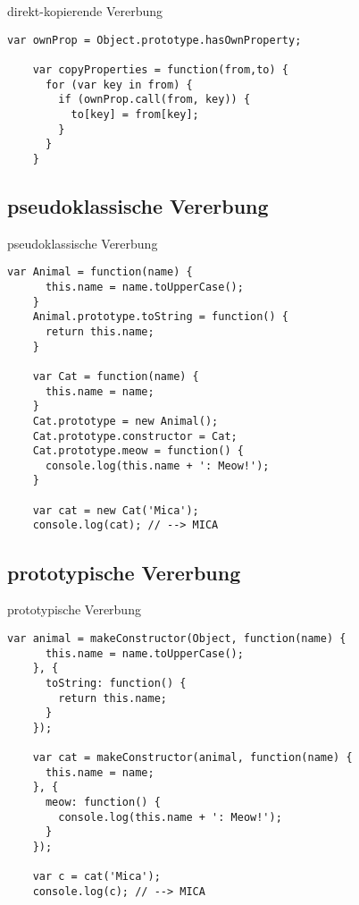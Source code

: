 \begin{frame}[fragile]{direkt-kopierende Vererbung}
  \begin{lstlisting}[gobble=4]
    var ownProp = Object.prototype.hasOwnProperty;
  
    var copyProperties = function(from,to) {
      for (var key in from) {
        if (ownProp.call(from, key)) {
          to[key] = from[key];
        }
      }
    }
  \end{lstlisting}
\end{frame}

\subsection{pseudoklassische Vererbung}

\lstset{basicstyle=\ttfamily\scriptsize}

\begin{frame}[fragile]{pseudoklassische Vererbung}
  \begin{lstlisting}[gobble=4]
    var Animal = function(name) {
      this.name = name.toUpperCase();
    }
    Animal.prototype.toString = function() {
      return this.name;
    }
    
    var Cat = function(name) {
      this.name = name;
    }
    Cat.prototype = new Animal();
    Cat.prototype.constructor = Cat;
    Cat.prototype.meow = function() {
      console.log(this.name + ': Meow!');
    }
    
    var cat = new Cat('Mica');
    console.log(cat); // --> MICA
  \end{lstlisting}
\end{frame}

\subsection{prototypische Vererbung}

\begin{frame}[fragile]{prototypische Vererbung}
  \begin{lstlisting}[gobble=4]
    var animal = makeConstructor(Object, function(name) {
      this.name = name.toUpperCase();
    }, {
      toString: function() {
        return this.name;
      }
    });
    
    var cat = makeConstructor(animal, function(name) {
      this.name = name;
    }, {
      meow: function() {
        console.log(this.name + ': Meow!');
      }
    });
    
    var c = cat('Mica');
    console.log(c); // --> MICA
  \end{lstlisting}
\end{frame}

